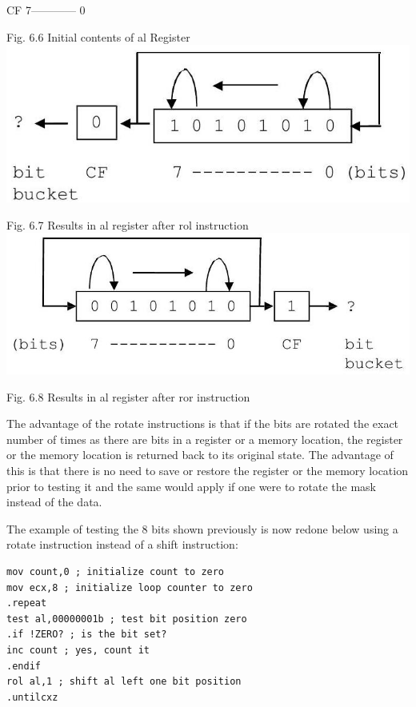 \documentclass[10pt]{article}
\begin{document}
CF 7------------ 0

Fig. 6.6 Initial contents of al Register\\
\includegraphics[max width=\textwidth, center]{2025_03_24_ebe50cc223a6fbc49eecg-123}

Fig. 6.7 Results in al register after rol instruction\\
\includegraphics[max width=\textwidth, center]{2025_03_24_ebe50cc223a6fbc49eecg-124}

Fig. 6.8 Results in al register after ror instruction

The advantage of the rotate instructions is that if the bits are rotated the exact number of times as there are bits in a register or a memory location, the register or the memory location is returned back to its original state. The advantage of this is that there is no need to save or restore the register or the memory location prior to testing it and the same would apply if one were to rotate the mask instead of the data.

The example of testing the 8 bits shown previously is now redone below using a rotate instruction instead of a shift instruction:

\begin{verbatim}
mov count,0 ; initialize count to zero
mov ecx,8 ; initialize loop counter to zero
.repeat
test al,00000001b ; test bit position zero
.if !ZERO? ; is the bit set?
inc count ; yes, count it
.endif
rol al,1 ; shift al left one bit position
.untilcxz
\end{verbatim}
\end{document}
